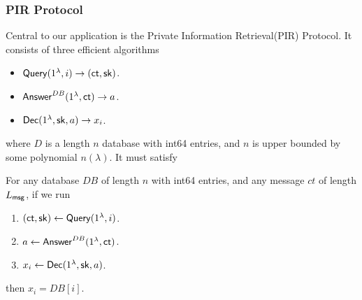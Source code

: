 \subsubsection{PIR Protocol}
Central to our application is the Private Information Retrieval(PIR) Protocol. It consists of three efficient algorithms
\begin{itemize}
    \item $\mathsf{Query}(1^{\lambda}, i) \to (\mathsf{ct}, {\mathsf{sk}})$.
    \item $\mathsf{Answer}^{DB}(1^{\lambda}, \mathsf{ct}) \to a$.
    \item $\mathsf{Dec}(1^{\lambda}, {\mathsf{sk}}, a) \to x_i$.
\end{itemize}
where $D$ is a length $n$ database with int64 entries, and $n$ is upper bounded by some polynomial $n(\lambda)$. It must satisfy
\begin{definition}[Correctness]
For any database $DB$ of length $n$ with int64 entries, and any message $ct$ of length $L_{\mathsf{msg}}$, if we run
\begin{enumerate}
    \item $(\mathsf{ct}, {\mathsf{sk}}) \leftarrow \mathsf{Query}(1^{\lambda}, i)$.
    \item $a \leftarrow \mathsf{Answer}^{DB}(1^{\lambda}, \mathsf{ct})$.
    \item $x_i \leftarrow \mathsf{Dec}(1^{\lambda}, {\mathsf{sk}}, a)$.
\end{enumerate}
then $x_i = DB[i]$.
\end{definition}
